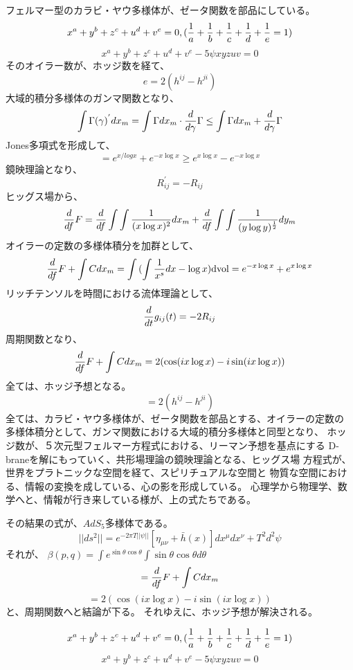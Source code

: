 \documentclass{jsarticle}
\begin{document}
\title{}
\author{}
\date{}
\maketitle
   フェルマー型のカラビ・ヤウ多様体が、ゼータ関数を部品にしている。
   $$ x^a + y^b + z^c + u^d + v^e = 0, ({1 \over a} + {1 \over b}
 + {1 \over c} + {1 \over d} + {1 \over e} = 1) $$
   $$ x^a + y^b + z^c + u^d + v^e - 5 \psi xyzuv = 0 $$
   そのオイラー数が、ホッジ数を経て、
   $$ e = 2(h^{ij} - h^{ji}) $$
   大域的積分多様体のガンマ関数となり、　
   $$ \int \Gamma(\gamma)^{'}dx_m = \int \Gamma dx_m \cdot {d \over d \gamma}
   \Gamma \le \int \Gamma dx_m + {d \over d \gamma}\Gamma $$
   Jones多項式を形成して、
   $$ = e^{x /log x} + e^{-x \log x} \ge e^{x \log x} - e^{-x \log x} $$
   鏡映理論となり、
   $$ R_{ij}^{'} = - R_{ij} $$
   ヒッグス場から、
   $$ {d \over df}F = {d \over df}\int\int{{1 \over {(x \log x)^2}}}dx_m 
   + {d \over df}\int\int{{1 \over {(y \log y)^{1 \over 2}}}}dy_m $$
   オイラーの定数の多様体積分を加群として、
   $$ {d \over df}F + \int C dx_m = \int {(\int {1 \over {x^s}}dx 
   - \log x)}\mathrm{dvol} = e^{-x \log x} + e^{x \log x} $$
   リッチテンソルを時間における流体理論として、
   $$ {d \over dt}g_{ij}(t) = - 2 R_{ij} $$
   周期関数となり、
   $$ {d \over df}F + \int C dx_m = 2 (\cos (i x \log x) - i\sin(i x \log x)) $$
   全ては、ホッジ予想となる。
   $$ = 2(h^{ij} - h^{ji}) $$
   全ては、カラビ・ヤウ多様体が、ゼータ関数を部品とする、オイラーの定数の
   多様体積分として、ガンマ関数における大域的積分多様体と同型となり、
   ホッジ数が、５次元型フェルマー方程式における、リーマン予想を基点にする
   D-braneを解にもっていく、共形場理論の鏡映理論となる、ヒッグス場
   方程式が、世界をプラトニックな空間を経て、スピリチュアルな空間と
   物質な空間における、情報の変換を成している、心の影を形成している。
   心理学から物理学、数学へと、情報が行き来している様が、上の式たちである。

   その結果の式が、$AdS_5$多様体である。
   $$ ||ds^2|| = e^{-2\pi T ||\psi||}[\eta_{\mu\nu} + \bar{h}(x)]
   dx^{\mu}dx^{\nu} + T^2 d^2 \psi $$
   それが、
   $\beta(p,q) = \int e^{\sin \theta \cos \theta} \int \sin \theta \cos \theta
   d \theta $
   $$ = {d \over df}F + \int C dx_m$$
   $$ = 2 (\cos (i x \log x) - i \sin(i x \log x)) $$
   と、周期関数へと結論が下る。
   それゆえに、ホッジ予想が解決される。

   $$ x^a + y^b + z^c + u^d + v^e = 0, ({1 \over a} + {1 \over b}
 + {1 \over c} + {1 \over d} + {1 \over e} = 1) $$
   $$ x^a + y^b + z^c + u^d + v^e - 5 \psi xyzuv = 0 $$
 
\end{document}
